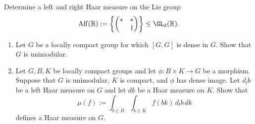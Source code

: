 \documentclass[reqno]{amsart} 
\begin{document}
\begin{exercise}
  Determine a left and right Haar measure
  on the Lie group
  \begin{equation*}
    \operatorname{Aff}(\mathbb{R})
    :=
    \left\{ 
\begin{pmatrix}
      \ast & \ast \\
       & 1
     \end{pmatrix}
 \right\}
   \leq \GL_2(\mathbb{R}).
  \end{equation*}
\end{exercise}

\begin{exercise}
  \begin{enumerate}
  \item Let $G$ be a locally compact group for which
    $[G,G]$ is dense in $G$.
    Show that $G$ is unimodular.    
  \item Let $G,B,K$ be
    locally compact groups
    and let $\phi : B \times K \rightarrow G$
    be a morphism.
    Suppose that $G$ is unimodular,
    $K$ is compact, and $\phi$ has dense image.
    Let $d_l b$ be a left Haar measure on $G$
    and let $d k$ be a Haar measure on $K$.
    Show that
    \begin{equation*}
    \mu(f) := \int_{b \in B} \int_{k \in K} f(b k) \, d_l b \, d k
    \end{equation*}
    defines a Haar measure on $G$.
  \end{enumerate}
\end{exercise}
\end{document}
